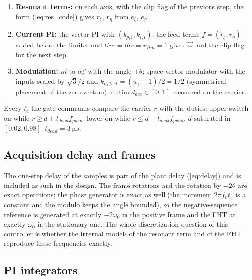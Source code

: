 \documentclass[10pt,a4paper]{scrartcl}
\newcommand{\ts}{t_s}
\newcommand{\wo}{\omega_0}
\newcommand{\kpi}{k_{p,i}}
\newcommand{\kii}{k_{i,i}}
\newcommand{\jj}{\mathrm{j}}
\newcommand{\ee}{\mathrm{e}}
\begin{document}
\begin{onehalfspace}
\begin{enumerate}
\begin{equation}
i^*_\xi = i^*_{\xi p} + c_2\,i^*_{\xi n} + s_2\,i^*_{\eta n}, \qquad i^*_\eta = i^*_{\eta p} - s_2\,i^*_{\xi n} + c_2\,i^*_{\eta n},
\label{eq:rot2theta}
\end{equation}
i.e. $\vec i^* = \vec i^*_p + \vec i^*_n\,\ee^{-\jj2\theta}$; the errors $\vec e_i = \vec i^* - \vec i_{\xi\eta}$.
\item \textbf{Resonant terms:} on each axis, with the clip flag of the previous step, the form (\ref{eq:res_code}) gives $r_\xi$, $r_\eta$ from $e_\xi$, $e_\eta$.
\item \textbf{Current PI:} the vector PI with $(\kpi, \kii)$, the feed terms $f = (r_\xi, r_\eta)$ added before the limiter and $lim = thr = u_{lim} = 1$ gives $\vec m$ and the clip flag for the next step.
\item \textbf{Modulation:} $\vec m$ to $\alpha\beta$ with the angle $+\theta$; space-vector modulator with the inputs scaled by $\sqrt3/2$ and $k_{offset} = (u_\gamma + 1)/2 = 1/2$ (symmetrical placement of the zero vectors), duties $d_{abc} \in [0, 1]$ measured on the carrier.
\end{enumerate}
Every $t_c$ the gate commands compare the carrier $r$ with the duties: upper switch on while $r \ge d + t_{dead}f_{pwm}$, lower on while $r \le d - t_{dead}f_{pwm}$, $d$ saturated in $[0.02, 0.98]$, $t_{dead} = \SI{3}{\micro s}$.

\subsection{Acquisition delay and frames}

The one-step delay of the samples is part of the plant delay (\ref{eq:delay}) and is included as such in the design. The frame rotations and the rotation by $-2\theta$ are exact operations; the phase generator is exact as well (the increment $2\pi f_0\ts$ is a constant and the modulo keeps the angle bounded), so the negative-sequence reference is generated at exactly $-2\wo$ in the positive frame and the FHT at exactly $\wo$ in the stationary one. The whole discretization question of this controller is whether the internal models of the resonant term and of the FHT reproduce these frequencies exactly.

\subsection{PI integrators}
\label{sec:disc_pi}


\end{onehalfspace}
\end{document}
